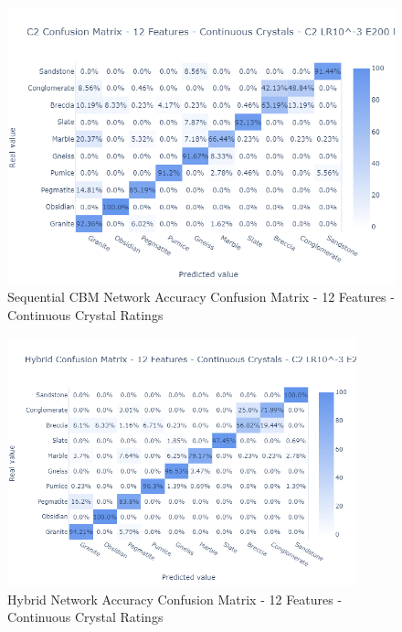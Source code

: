 \begin{figure}[H]
  \centering
    \includegraphics[width=\textwidth, trim = 0cm 0cm 0.5cm 3.5cm, clip]{images/C2 Confusion Matrix - 12 Features - Continuous Crystals.png}
    \caption{Sequential CBM Network Accuracy Confusion Matrix - 12 Features - Continuous Crystal Ratings} \label{fig:Sequential CBM Network Accuracy Confusion Matrix - 12 Features - Continuous Crystal Ratings}
\end{figure}

\begin{figure}[H]
  \centering
    \includegraphics[width=0.9\textwidth, trim = 0cm 0cm 0.5cm 3.5cm, clip]{images/Hybrid Confusion Matrix - 12 Features - Continuous Crystals.png}
    \caption{Hybrid Network Accuracy Confusion Matrix - 12 Features - Continuous Crystal Ratings} \label{fig:Hybrid Network Accuracy Confusion Matrix- 12 Features - Continuous Crystal Ratings}
\end{figure}


